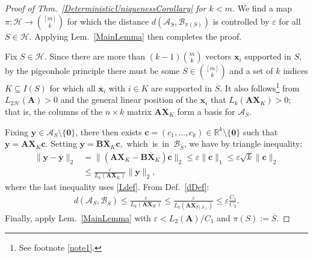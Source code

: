 \documentclass[journal, twocolumn]{IEEEtran}
\begin{document}
\begin{proof}[Proof of Thm.~\ref{DeterministicUniquenessCorollary} for $k < m$] 
We find a map $\pi: \mathcal{H} \to {[m] \choose k}$ for which the distance $d(\bm{\mathcal{A}}_S, \bm{\mathcal{B}}_{\pi(S)})$ is controlled by $\varepsilon$ for all $S \in \mathcal{H}$. Applying Lem.~\ref{MainLemma} then completes the proof.

Fix $S \in \mathcal{H}$. Since there are more than $(k-1){\overline m \choose k}$ vectors $\mathbf{x}_i$ supported in $S$, by the pigeonhole principle there must be some $\overline S \in {[\overline m] \choose k}$ and a set of $k$ indices $K \subseteq I(S)$ for which all $\mathbf{\overline x}_i$ with $i \in K$ are supported in $\overline S$.
It also follows\footnote{See footnote \ref{note1}.} from $L_{2\mathcal{H}}(\mathbf{A}) > 0$ and the general linear position of the $\mathbf{x}_i$ that $L_k(\mathbf{AX}_{K}) > 0$; that is, the columns of the $n \times k$ matrix $\mathbf{AX}_K$ form a basis for $\bm{\mathcal{A}}_S$. 

Fixing $\mathbf{y} \in \bm{\mathcal{A}}_S \setminus \{\mathbf{0}\}$, there then exists $\mathbf{c} = (c_1, \ldots, c_k) \in \mathbb{R}^k \setminus \{\mathbf{0}\}$ such that $\mathbf{y} = \mathbf{AX}_K\mathbf{c}$. Setting \mbox{$\mathbf{\overline{y}} = \mathbf{B\overline{X}}_K\mathbf{c}$, which is in $\bm{\mathcal{B}}_{\overline S}$}, we have by triangle inequality:
\begin{align*}
\|\mathbf{y} - \mathbf{\overline{y}}\|_2 
&= \|(\mathbf{AX}_K - \mathbf{B\overline{X}}_K)\mathbf{c}\|_2
\leq \varepsilon \|\mathbf{c}\|_1
\leq \varepsilon \sqrt{k}  \|\mathbf{c}\|_2  \\
&\leq \frac{\varepsilon}{L_k(\mathbf{AX}_K)} \|\mathbf{y}\|_2,
\end{align*}
where the last inequality uses \eqref{Ldef}. From Def.~\ref{dDef}:
\begin{align}\label{rhs222}
d(\bm{\mathcal{A}}_S, \bm{\mathcal{B}}_{\overline S}) 
\leq \frac{\varepsilon}{  L_k(\mathbf{AX}_{K}) } 
\leq \frac{\varepsilon}{  L_k(\mathbf{AX}_{I(S)}) } 
\leq \varepsilon \frac{C_1}{C_2}.
\end{align}
%
Finally, apply Lem.~\ref{MainLemma} with $\varepsilon < L_2(\mathbf{A})/C_1$ and $\pi(S) := \overline S$. %
\end{proof}
\end{document}
